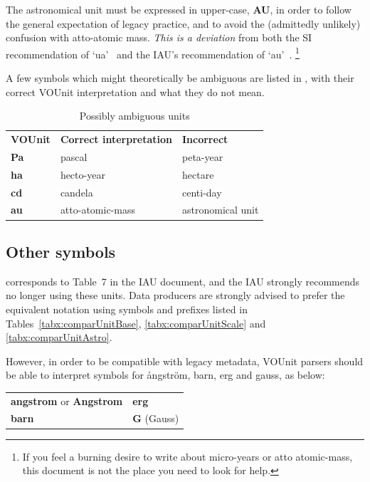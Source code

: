 \documentclass[11pt,notitlepage,onecolumn]{ivoa}
\newcommand{\unit}[1]{\textbf{\textsf{\color{orange}#1}}}
\begin{document}
The astronomical unit must be expressed in upper-case, \unit{AU},
in order to follow the general expectation of legacy practice,
and to avoid the (admittedly unlikely) confusion with atto-atomic mass.
\emph{This is a deviation} from both the SI recommendation of
`ua'~\citep{si-brochure} and the IAU's recommendation of `au'~\citep{iau12}.%
\footnote{If you feel a burning desire to write about micro-years or
atto atomic-mass, this document is not the place you need to look
for help.}

A few symbols which might theoretically be ambiguous are listed in ,
with their correct VOUnit interpretation and what they do not mean.


\begin{table}[bht]
\begin{center}
\begin{tabular}{lll}
\textbf{VOUnit}&\textbf{Correct interpretation}&\textbf{Incorrect}\\
\unit{Pa}&pascal&peta-year\\
\unit{ha}&hecto-year&hectare\\
\unit{cd}&candela&centi-day\\
\unit{au}&atto-atomic-mass&astronomical unit\\
\end{tabular}
\end{center}
\caption{\label{tab:ambiguous}Possibly ambiguous units}
\end{table}

\subsection{Other symbols}

 corresponds to Table~7 in the IAU document, and the IAU strongly
recommends no longer using these units. 
Data producers are strongly advised to prefer the equivalent notation using symbols and prefixes listed in 
Tables~\ref{tabx:comparUnitBase}, \ref{tabx:comparUnitScale} and \ref{tabx:comparUnitAstro}. 

However, in order to be compatible with legacy metadata, VOUnit parsers should be able to interpret
symbols for \aa{}ngstr\"om, barn, erg and gauss, as below:

\medskip

\begin{tabular}{|l|l|}\hline
\unit{angstrom} or \unit{Angstrom} 	&\unit{erg}    	\\
\unit{barn}		&\unit{G} (Gauss)    		\\\hline
\end{tabular}
\end{document}

